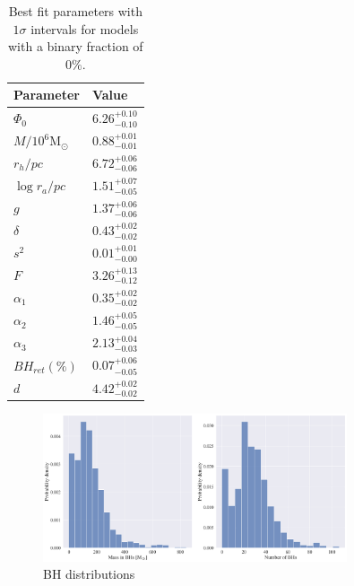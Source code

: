 \begin{table}
	\centering
	\caption{Best fit parameters with $1\sigma$ intervals for models with a binary fraction of $0\%$.}
	\begin{tabular}{l l}

		\hline
		Parameter                 & Value                  \\
		\hline
		$\Phi_0$                  & $6.26^{+0.10}_{-0.10}$ \\
		$M/10^6 \mathrm{M}_\odot$ & $0.88^{+0.01}_{-0.01}$ \\
		$r_h / pc$                & $6.72^{+0.06}_{-0.06}$ \\
		$\log{r_a / pc}$          & $1.51^{+0.07}_{-0.05}$ \\
		$g$                       & $1.37^{+0.06}_{-0.06}$ \\
		$\delta$                  & $0.43^{+0.02}_{-0.02}$ \\
		$s^2$                     & $0.01^{+0.01}_{-0.00}$ \\
		$F$                       & $3.26^{+0.13}_{-0.12}$ \\
		$\alpha_1$                & $0.35^{+0.02}_{-0.02}$ \\
		$\alpha_2$                & $1.46^{+0.05}_{-0.05}$ \\
		$\alpha_3$                & $2.13^{+0.04}_{-0.03}$ \\
		$BH_{ret} (\%)$           & $0.07^{+0.06}_{-0.05}$ \\
		$d$                       & $4.42^{+0.02}_{-0.02}$ \\
		\hline
	\end{tabular}
	\label{tab:parameters_nobin}
\end{table}

\begin{figure}
	\centering
	\includegraphics[width=0.8\textwidth]{figures/prev_nobin/BH_dists.png}
	\caption{BH distributions}
	\label{fig:prev_nobin_BH_dists}
\end{figure}


